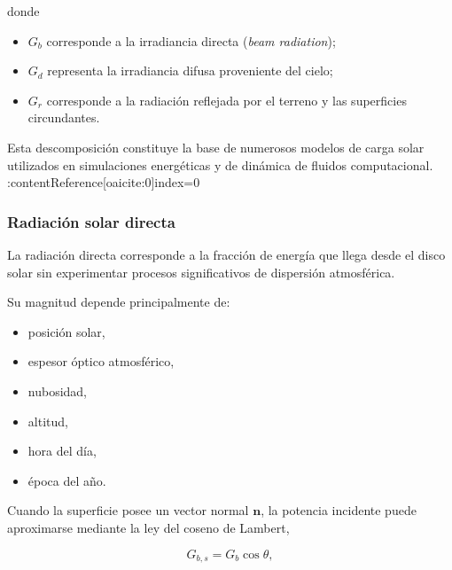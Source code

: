 donde

\begin{itemize}

\item $G_b$ corresponde a la irradiancia directa (\textit{beam radiation});

\item $G_d$ representa la irradiancia difusa proveniente del cielo;

\item $G_r$ corresponde a la radiación reflejada por el terreno y las superficies circundantes.
\end{itemize}

Esta descomposición constituye la base de numerosos modelos de carga solar utilizados en simulaciones energéticas y de dinámica de fluidos computacional. :contentReference[oaicite:0]{index=0}

\subsubsection{Radiación solar directa}

La radiación directa corresponde a la fracción de energía que llega desde el disco solar sin experimentar procesos significativos de dispersión atmosférica.

Su magnitud depende principalmente de:

\begin{itemize}

\item posición solar,

\item espesor óptico atmosférico,

\item nubosidad,

\item altitud,

\item hora del día,

\item época del año.
\end{itemize}

Cuando la superficie posee un vector normal $\mathbf n$, la potencia incidente puede aproximarse mediante la ley del coseno de Lambert,

\begin{equation}
G_{b,s}
=
G_b
\cos\theta,
\end{equation}

